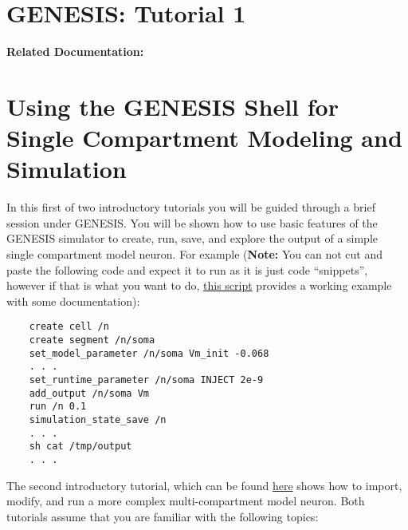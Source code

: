 \documentclass[12pt]{article}
\begin{document}
\section*{GENESIS: Tutorial 1}

{\bf Related Documentation:}

\section*{Using the GENESIS Shell for\\Single Compartment Modeling and Simulation}

In this first of two introductory tutorials you will be guided through a brief session under GENESIS. You will be shown how to use basic features of the GENESIS simulator to create, run, save, and explore the output of a simple single compartment model neuron. For example ({\bf Note:} You can not cut and paste the following code and expect it to run as it is just code ``snippets'', however if that is what you want to do, \href{../example-script1/example-script1.tex}{this script} provides a working example with some documentation):

\begin{verbatim}
    create cell /n
    create segment /n/soma
    set_model_parameter /n/soma Vm_init -0.068
    . . .
    set_runtime_parameter /n/soma INJECT 2e-9
    add_output /n/soma Vm
    run /n 0.1
    simulation_state_save /n
    . . . 
    sh cat /tmp/output
    . . . 
\end{verbatim}
The second introductory tutorial, which can be found \href{../tutorial2/tutorial2.tex}{here} shows how to import, modify, and run a more complex multi-compartment model neuron. Both tutorials assume that you are familiar with the following topics:
\end{document}
